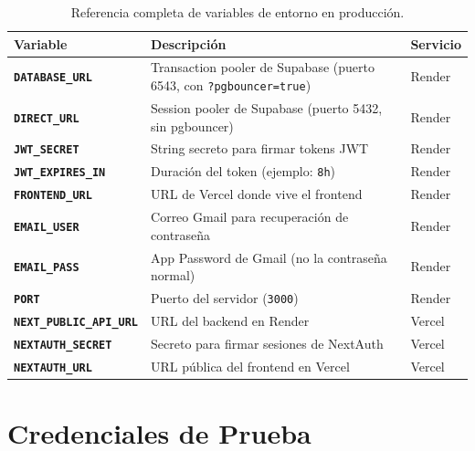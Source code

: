 \documentclass[12pt, a4paper]{article}
\newcommand{\cmd}[1]{\texttt{#1}}
\newcommand{\var}[1]{\texttt{\textbf{#1}}}
\begin{document}
\begin{table}[H]
    \centering
    \begin{tabular}{p{4.5cm} p{5.5cm} p{3cm}}
        \toprule
        \textbf{Variable} & \textbf{Descripción} & \textbf{Servicio} \\
        \midrule
        \var{DATABASE\_URL}          & Transaction pooler de Supabase (puerto 6543, con \cmd{?pgbouncer=true}) & Render \\[0.2cm]
        \var{DIRECT\_URL}            & Session pooler de Supabase (puerto 5432, sin pgbouncer)                & Render \\[0.2cm]
        \var{JWT\_SECRET}            & String secreto para firmar tokens JWT                                  & Render \\[0.2cm]
        \var{JWT\_EXPIRES\_IN}       & Duración del token (ejemplo: \cmd{8h})                                 & Render \\[0.2cm]
        \var{FRONTEND\_URL}          & URL de Vercel donde vive el frontend                                   & Render \\[0.2cm]
        \var{EMAIL\_USER}            & Correo Gmail para recuperación de contraseña                           & Render \\[0.2cm]
        \var{EMAIL\_PASS}            & App Password de Gmail (no la contraseña normal)                        & Render \\[0.2cm]
        \var{PORT}                   & Puerto del servidor (\cmd{3000})                                       & Render \\[0.2cm]
        \var{NEXT\_PUBLIC\_API\_URL} & URL del backend en Render                                              & Vercel \\[0.2cm]
        \var{NEXTAUTH\_SECRET}       & Secreto para firmar sesiones de NextAuth                               & Vercel \\[0.2cm]
        \var{NEXTAUTH\_URL}          & URL pública del frontend en Vercel                                     & Vercel \\
        \bottomrule
    \end{tabular}
    \caption{Referencia completa de variables de entorno en producción.}
\end{table}

\section{Credenciales de Prueba}
\end{document}
